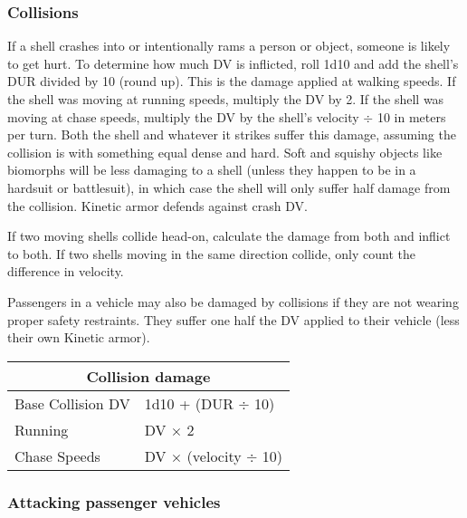 \subsubsection{Collisions} 

If a shell crashes into or intentionally rams a person or object, someone is likely to get hurt. To determine how much DV is inflicted, roll 1d10 and add the shell’s DUR divided by 10 (round up). This is the damage applied at walking speeds. If the shell was moving at running speeds, multiply the DV by 2. If the shell was moving at chase speeds, multiply the DV by the shell’s velocity $\div$ 10 in meters per turn. Both the shell and whatever it strikes suffer this damage, assuming the collision is with something equal dense and hard. Soft and squishy objects like biomorphs will be less damaging to a shell (unless they happen to be in a hardsuit or battlesuit), in which case the shell will only suffer half damage from the collision. Kinetic armor defends against crash DV. 

If two moving shells collide head-on, calculate the damage from both and inflict to both. If two shells moving in the same direction collide, only count the difference in velocity. 

Passengers in a vehicle may also be damaged by collisions if they are not wearing proper safety restraints. They suffer one half the DV applied to their vehicle (less their own Kinetic armor). 

\begin{table} \begin{tabular}{|l|l|} \hline

\multicolumn{2}{|c|}{\textbf{Collision damage}}	\\ \hline

Base Collision DV	&1d10 + (DUR $\div$ 10)	\\ \hline

Running	&DV $\times$ 2	\\ \hline

Chase Speeds	&DV $\times$ (velocity $\div$ 10)	\\ \hline

\end{tabular} \label{tab:collision-damage} \end{table} 

\subsubsection{Attacking passenger vehicles} 


